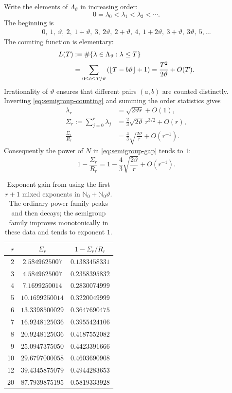 \documentclass[11pt,oneside]{article}
\theoremstyle{definition}
\theoremstyle{remark}
\newcommand{\Nzero}{\mathbb N_0}
\newcommand{\thetaq}{\vartheta}
\newcommand{\LambdaTheta}{\Lambda_{\thetaq}}
\begin{document}
Write the elements of $\LambdaTheta$ in increasing order:
\[
 0=\lambda_0<\lambda_1<\lambda_2<\cdots.
\]
The beginning is
\begin{align*}
 0,\ 1,\ \thetaq,\ 2,\ 1+\thetaq,\ 3,\ 2\thetaq,\ 2+\thetaq,\ 4,
 \ 1+2\thetaq,\ 3+\thetaq,\ 3\thetaq,\ 5,\ldots
\end{align*}
The counting function is elementary:
\begin{align}
 L(T)
 &:=\#\{\lambda\in\LambdaTheta:\lambda\le T\}\notag\\
 &=\sum_{0\le b\le T/\thetaq}
   \left(\left\lfloor T-b\thetaq\right\rfloor+1\right)
 =\frac{T^2}{2\thetaq}+O(T).
 \label{eq:semigroup-counting}
\end{align}
Irrationality of $\thetaq$ ensures that different pairs $(a,b)$ are counted distinctly.
Inverting \eqref{eq:semigroup-counting} and summing the order statistics gives
\begin{align}
 \lambda_r
 &=\sqrt{2\thetaq r}+O(1),
 \label{eq:lambda-asymp}\\
 \Sigma_r:=\sum_{j=0}^{r}\lambda_j
 &=\frac23\sqrt{2\thetaq}\,r^{3/2}+O(r),
 \label{eq:sigma-asymp}\\
 \frac{\Sigma_r}{R_r}
 &=\frac43\sqrt{\frac{2\thetaq}{r}}+O(r^{-1}).
 \label{eq:sigma-ratio-asymp}
\end{align}
Consequently the power of $N$ in \eqref{eq:semigroup-gap} tends to $1$:
\begin{equation}
 1-\frac{\Sigma_r}{R_r}
 =1-\frac43\sqrt{\frac{2\thetaq}{r}}+O(r^{-1}).
 \label{eq:delta-asymp}
\end{equation}

\begin{table}[ht]
\centering
\small
\begin{tabular}{rcc}
\toprule
$r$ & $\Sigma_r$ & $1-\Sigma_r/R_r$ \\
\midrule
2  & $2.5849625007$  & $0.1383458331$ \\
3  & $4.5849625007$  & $0.2358395832$ \\
4  & $7.1699250014$  & $0.2830074999$ \\
5  & $10.1699250014$ & $0.3220049999$ \\
6  & $13.3398500029$ & $0.3647690475$ \\
7  & $16.9248125036$ & $0.3955424106$ \\
8  & $20.9248125036$ & $0.4187552082$ \\
9  & $25.0947375050$ & $0.4423391666$ \\
10 & $29.6797000058$ & $0.4603690908$ \\
12 & $39.4345875079$ & $0.4944283653$ \\
20 & $87.7939875195$ & $0.5819333928$ \\
\bottomrule
\end{tabular}
\caption{Exponent gain from using the first $r+1$ mixed exponents in
$\Nzero+\Nzero\thetaq$.  The ordinary-power family peaks and then decays; the semigroup
family improves monotonically in these data and tends to exponent $1$.}
\label{tab:semigroup-delta}
\end{table}
\end{document}
